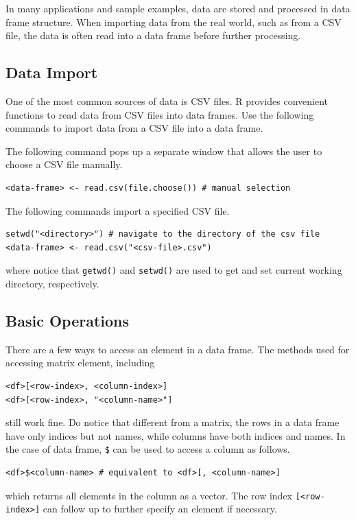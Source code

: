 In many applications and sample examples, data are stored and processed in data frame structure. When importing data from the real world, such as from a CSV file, the data is often read into a data frame before further processing.

\subsection{Data Import}

One of the most common sources of data is CSV files. R provides convenient functions to read data from CSV files into data frames. Use the following commands to import data from a CSV file into a data frame.

The following command pops up a separate window that allows the user to choose a CSV file manually.
\begin{lstlisting}
<data-frame> <- read.csv(file.choose()) # manual selection
\end{lstlisting}

The following commands import a specified CSV file.
\begin{lstlisting}
setwd("<directory>") # navigate to the directory of the csv file
<data-frame> <- read.csv("<csv-file>.csv")
\end{lstlisting}
where notice that \verb|getwd()| and \verb|setwd()| are used to get and set current working directory, respectively.

\subsection{Basic Operations}

There are a few ways to access an element in a data frame. The methods used for accessing matrix element, including
\begin{lstlisting}
<df>[<row-index>, <column-index>]
<df>[<row-index>, "<column-name>"]
\end{lstlisting}
still work fine. Do notice that different from a matrix, the rows in a data frame have only indices but not names, while columns have both indices and names. In the case of data frame, \verb|$| can be used to access a column as follows.
\begin{lstlisting}
<df>$<column-name> # equivalent to <df>[, <column-name>]
\end{lstlisting}
which returns all elements in the column as a vector. The row index \verb|[<row-index>]| can follow up to further specify an element if necessary.

